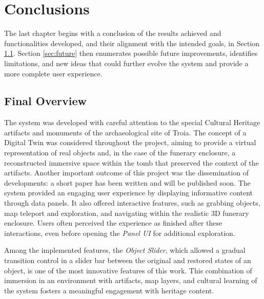 
%

\chapter{Conclusions}
\label{cha:conclusions}
The last chapter begins with a conclusion of the results achieved and functionalities developed, and their alignment with the intended goals, in Section \ref{sec:final_overview}.
Section \ref{sec:future} then enumerates possible future improvements, identifies limitations, and new ideas that could further evolve the system and provide a more complete user experience.
\section{Final Overview}
\label{sec:final_overview}
The system was developed with careful attention to the special Cultural Heritage artifacts and monuments of the archaeological site of Troia. The concept of a Digital Twin was considered throughout the project, aiming to provide a virtual representation of real objects and, in the case of the funerary enclosure, a reconstructed immersive space within the tomb that preserved the context of the artifacts. Another important outcome of this project was the dissemination of developments: a short paper has been written and will be published soon.
The system provided an engaging user experience by displaying informative content through data panels. It also offered interactive features, such as grabbing objects, map teleport and exploration, and navigating within the realistic \gls{3D} funerary enclosure. Users often perceived the experience as finished after these interactions, even before opening the \emph{Panel \gls{UI}} for additional exploration. 

Among the implemented features, the \emph{Object Slider}, which allowed a gradual transition control in a slider bar between the original and restored states of an object, is one of the most innovative features of this work. This combination of immersion in an environment with artifacts, map layers, and cultural learning of the system fosters a meaningful engagement with heritage content.

